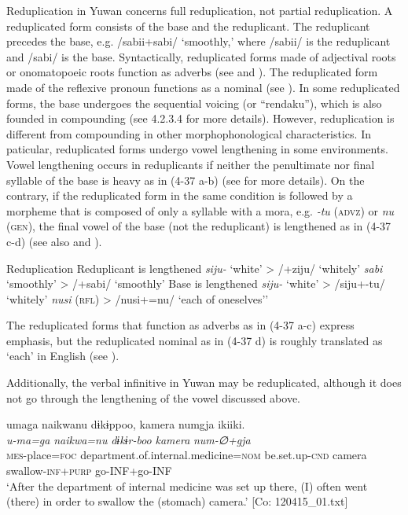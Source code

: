 Reduplication in Yuwan concerns full reduplication, not partial reduplication. A reduplicated form consists of the base and the reduplicant. The reduplicant precedes the base, e.g. /sabii+sabi/ ‘smoothly,’ where /sabii/ is the reduplicant and /sabi/ is the base. Syntactically, reduplicated forms made of adjectival roots or onomatopoeic roots function as adverbs (see  and ). The reduplicated form made of the reflexive pronoun functions as a nominal (see ). In some reduplicated forms, the base undergoes the sequential voicing (or “rendaku”), which is also founded in compounding (see 4.2.3.4 for more details). However, reduplication is different from compounding in other morphophonological characteristics. In paticular, reduplicated forms undergo vowel lengthening in some environments. Vowel lengthening occurs in reduplicants if neither the penultimate nor final syllable of the base is heavy as in (4-37 a-b) (see  for more details). On the contrary, if the reduplicated form in the same condition is followed by a morpheme that is composed of only a syllable with a mora, e.g. \textit{{}-tu} (\textsc{advz}) or \textit{nu} (\textsc{gen}), the final vowel of the base (not the reduplicant) is lengthened as in (4-37 c-d) (see also  and ).

\ea  Reduplication \label{ex:4.37}
 Reduplicant is lengthened
  \ea  \textit{siju-}  ‘white’  >  /+ziju/  ‘whitely’
  \ex  \textit{sabi}  ‘smoothly’  >  /+sabi/  ‘smoothly’
 Base is lengthened
  \ex  \textit{siju-}  ‘white’  >  /siju+-tu/  ‘whitely’
  \ex  \textit{nusi}  (\textsc{rfl})  >  /nusi+=nu/  ‘each of oneselves’’
  \z
\z

The reduplicated forms that function as adverbs as in (4-37 a-c) express emphasis, but the reduplicated nominal as in (4-37 d) is roughly translated as ‘each’ in English (see ).

  Additionally, the verbal infinitive in Yuwan may be reduplicated, although it does not go through the lengthening of the vowel discussed above.

\ea  \label{ex:4.38}
\ea %
\glll    umaga  naikwanu  dɨkɨppoo,   {\textbar}kamera{\textbar}  numgja  ikiiki.\\
      \textit{u-ma=ga}  \textit{naikwa=nu}  \textit{dɨkɨr-boo}    \textit{kamera}  \textit{num-∅+gja}  \textit{}\\
      \textsc{mes}-place=\textsc{foc}  department.of.internal.medicine=\textsc{nom}  be.set.up-\textsc{cnd}  camera  swallow-\textsc{inf}+\textsc{purp}  go-INF+go-INF      \\
      \glt       ‘After the department of internal medicine was set up there, (I) often went (there) in order to swallow the (stomach) camera.’ [Co: 120415\_01.txt]

